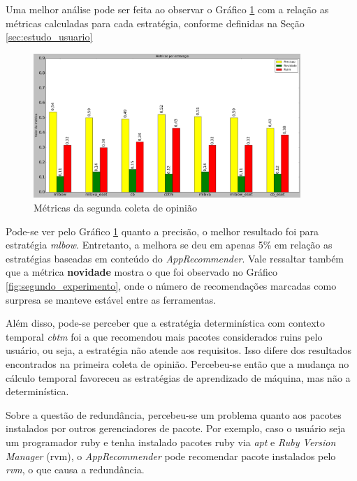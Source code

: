 Uma melhor análise pode ser feita ao observar o Gráfico
\ref{fig:metricas_segundo_experimento} com a relação as métricas calculadas para cada
estratégia, conforme definidas na Seção \ref{sec:estudo_usuario}

\begin{figure}[h]
  \centering
  \includegraphics[width=0.9\textwidth]{figuras/metricas_segundo_experimento.eps}
  \caption{Métricas da segunda coleta de opinião}
  \label{fig:metricas_segundo_experimento}
\end{figure}

Pode-se ver pelo Gráfico \ref{fig:metricas_segundo_experimento} quanto a
precisão, o melhor resultado foi para estratégia \textit{mlbow}. Entretanto, a
melhora se deu em apenas 5\% em relação as estratégias baseadas em conteúdo do
\textit{AppRecommender}. Vale ressaltar também que a métrica \textbf{novidade}
mostra o que foi observado no Gráfico \ref{fig:segundo_experimento}, onde o
número de recomendações marcadas como surpresa se manteve estável entre as
ferramentas.

Além disso, pode-se perceber que a estratégia determinística com contexto
temporal \textit{cbtm} foi a que recomendou mais pacotes considerados ruins
pelo usuário, ou seja, a estratégia não atende aos requisitos. Isso difere dos
resultados encontrados na primeira coleta de opinião. Percebeu-se então que a mudança
no cálculo temporal favoreceu as estratégias de aprendizado de máquina, mas não
a determinística.

Sobre a questão de redundância, percebeu-se um problema quanto aos pacotes
instalados por outros gerenciadores de pacote. Por exemplo, caso o usuário seja
um programador ruby e tenha instalado pacotes ruby via \textit{apt} e
\textit{Ruby Version Manager} (rvm), o \textit{AppRecommender} pode recomendar
pacote instalados pelo \textit{rvm}, o que causa a redundância.

